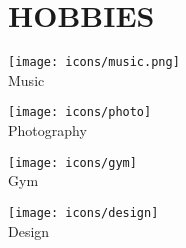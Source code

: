 \section*{\MakeUppercase{Hobbies}}

\begin{minipage}[t]{.15\textwidth}
	\centering
	\vbox{\texttt{[image: icons/music.png]}\\[4pt]Music}
\end{minipage}
\begin{minipage}[t]{.15\textwidth}
	\centering
	\vbox{\texttt{[image: icons/photo]}\\[4pt]Photography}
\end{minipage}
\begin{minipage}[t]{.15\textwidth}
	\centering
	\vbox{\texttt{[image: icons/gym]}\\[4pt]Gym}
\end{minipage}
\begin{minipage}[t]{.15\textwidth}
	\centering
	\vbox{\texttt{[image: icons/design]}\\[4pt]Design}
\end{minipage}
